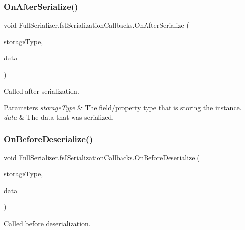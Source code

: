 \subsubsection{\texorpdfstring{On\+After\+Serialize()}{OnAfterSerialize()}}
{\footnotesize\ttfamily void Full\+Serializer.\+fs\+I\+Serialization\+Callbacks.\+On\+After\+Serialize (\begin{DoxyParamCaption}\item[{Type}]{storage\+Type,  }\item[{ref \hyperlink{class_full_serializer_1_1fs_data}{fs\+Data}}]{data }\end{DoxyParamCaption})}



Called after serialization. 


\begin{DoxyParams}{Parameters}
{\em storage\+Type} & The field/property type that is storing the instance.\\
\hline
{\em data} & The data that was serialized.\\
\hline
\end{DoxyParams}
\mbox{\label{interface_full_serializer_1_1fs_i_serialization_callbacks_a059856f60ed9d1b124ef4582820e6cde}} 
\subsubsection{\texorpdfstring{On\+Before\+Deserialize()}{OnBeforeDeserialize()}}
{\footnotesize\ttfamily void Full\+Serializer.\+fs\+I\+Serialization\+Callbacks.\+On\+Before\+Deserialize (\begin{DoxyParamCaption}\item[{Type}]{storage\+Type,  }\item[{ref \hyperlink{class_full_serializer_1_1fs_data}{fs\+Data}}]{data }\end{DoxyParamCaption})}



Called before deserialization. 


